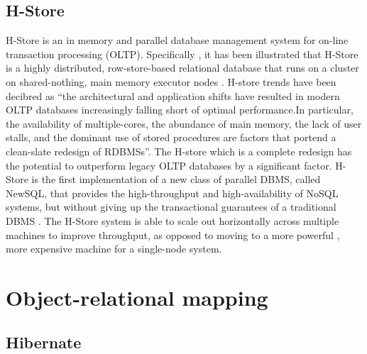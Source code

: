 \subsection{H-Store}

     H-Store is an in memory and parallel database management system
     for on-line transaction processing (OLTP). Specifically , it has been
     illustrated that H-Store is a highly
     distributed, row-store-based relational database that runs on a
     cluster on shared-nothing, main memory executor nodes \cite{www-Hstore}.
     H-store trends have been decibred as
      ``the architectural and application shifts
     have resulted in modern OLTP databases increasingly falling short
     of optimal performance.In particular, the availability of
     multiple-cores, the abundance of main memory, the lack of user
     stalls, and the dominant use of stored procedures are factors
     that portend a clean-slate redesign of RDBMSs''\cite{kallman2008}.
     The H-store which
     is a complete redesign has the potential to outperform legacy
     OLTP databases by a significant factor.
     H-Store is the first implementation of a
     new class of parallel DBMS, called NewSQL, that provides the
     high-throughput and high-availability of NoSQL systems, but
     without giving up the transactional guarantees of a traditional
     DBMS \cite{www-Hstorewiki}. The H-Store system
     is able to scale out horizontally
     across multiple machines to improve throughput, as opposed to
     moving to a more powerful , more expensive machine for a
     single-node system.

     \pv

\section{Object-relational mapping}
\label{S:o-db-object}

\subsection{Hibernate}

